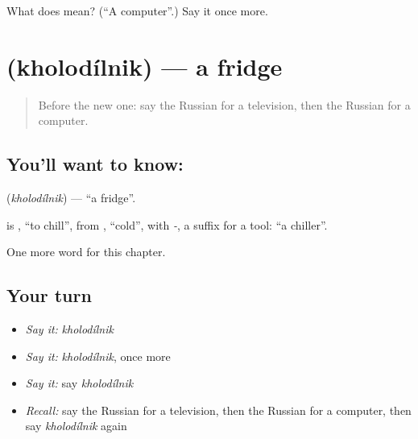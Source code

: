 \begin{tcolorbox}[breakable,colback=teal!4,colframe=teal!35!black,title={Before you move on}]
What does  mean? (\textquotedblleft{}A computer\textquotedblright{}.) Say it once more.
\end{tcolorbox}
\section[\texorpdfstring{\ru{холодильник} (kholodílnik)}{холодильник (kholodílnik)}]{ (kholodílnik) — a fridge}

\label{lesson:RU-C94-fridge}



\begin{quote}
Before the new one: say the Russian for a television, then the Russian for a computer.
\end{quote}

\subsection*{You'll want to know: }
\textbf{} (\emph{kholodílnik}) — \textquotedblleft{}a fridge\textquotedblright{}.

\begin{cousinweb}
\textbf{} is \emph{}, \textquotedblleft{}to chill\textquotedblright{}, from \emph{}, \textquotedblleft{}cold\textquotedblright{}, with \emph{-}, a suffix for a tool: \textquotedblleft{}a chiller\textquotedblright{}.
\end{cousinweb}

\begin{grammarlens}[title={What you've built}]
One more word for this chapter.
\end{grammarlens}

\subsection*{Your turn}
\begin{itemize}
\raggedright
  \item \emph{Say it:} \emph{kholodílnik}
  \item \emph{Say it:} \emph{kholodílnik}, once more
  \item \emph{Say it:} say \emph{kholodílnik}
  \item \emph{Recall:} say the Russian for a television, then the Russian for a computer, then say \emph{kholodílnik} again
\end{itemize}

